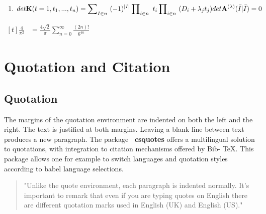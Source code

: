 \documentclass{article}
\begin{document}
\begin{enumerate}
                \item %
                
                $
                \!
                \begin{aligned}[t]
                    det{\mathbf{K}}(t=1,t_1,...,t_n)=\sum\nolimits_{I\in n}\ (-1)^{|I|}\prod\nolimits_{i\in n}\ t_i\prod\nolimits_{i\in n}\ (D_i+\lambda_jt_j)det{\mathbf{A}}^{(\lambda)}(\Bar{I}|\Bar{I})&=0
                \end{aligned}
                $
            \end{enumerate}
            $
            \begin{aligned}[t]
                \frac{4}{\pi^2}&=\frac{4\sqrt{2}}{\pi}\sum_{n=0}^{\infty}\frac{(2n)!}{6^{4n}}
            \end{aligned}
            $
        \newpage
    \section{Quotation and Citation}
        \subsection{Quotation}
            The margins of the quotation environment are indented on both the left and the right. The text is justified at both margins. Leaving a blank line between text produces a new paragraph. The package {\bf\ csquotes} offers a multilingual solution to quotations, with integration to citation mechanisms offered by Bib- TeX. This package allows one for example to switch languages and quotation styles according to babel language selections.
            \begin{quote}
                "Unlike the quote environment, each paragraph is indented normally. It's important to remark that even if you are typing quotes on English there are different quotation marks used in English (UK) and English (US)."
            \end{quote}
            
\end{document}

